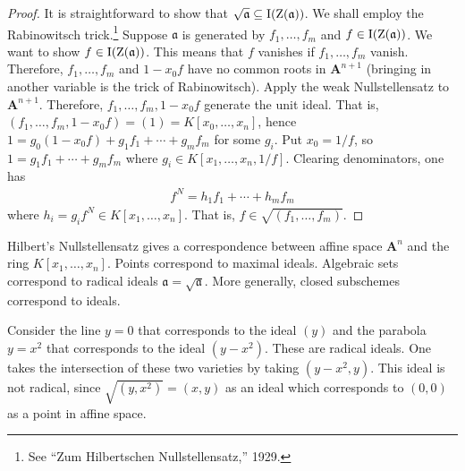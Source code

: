\documentclass[11pt, oneside,margin=1in]{article}
\begin{document}
\begin{proof}
It is straightforward to show that $\sqrt{\mathfrak{a}} \subseteq \operatorname{I}(\operatorname{Z}(\mathfrak{a}))$. We shall employ the Rabinowitsch trick.\footnote{See ``Zum Hilbertschen Nullstellensatz,'' 1929.} Suppose $\mathfrak{a}$ is generated by $f_1,\hdots, f_m$ and $f\in \operatorname{I}(\operatorname{Z}(\mathfrak{a}))$. We want to show $f\in \operatorname{I}(\operatorname{Z}(\mathfrak{a}))$. This means that $f$ vanishes if $f_1,\hdots, f_m$ vanish. Therefore, $f_1,\hdots, f_m$ and $1-x_0f$ have no common roots in $\mathbf{A}^{n+1}$ (bringing in another variable is the trick of Rabinowitsch). Apply the weak Nullstellensatz to $\mathbf{A}^{n+1}$. Therefore, $f_1,\hdots, f_m, 1-x_0f$ generate the unit ideal. That is, $(f_1,\hdots,f_m,1-x_0f) = (1) = K[x_0,\hdots, x_n]$, hence $1 = g_0(1-x_0f)+g_1f_1 +\cdots + g_mf_m$ for some $g_i$. Put $x_0=1/f$, so $1=g_1f_1+\cdots +g_mf_m$ where $g_i \in K[x_1,\hdots, x_n, 1/f]$. Clearing denominators, one has
\begin{align*}
	f^N = h_1f_1+\cdots + h_mf_m
\end{align*}
where $h_i=g_if^N\in K[x_1,\hdots, x_n]$. That is, $f\in \sqrt{(f_1,\hdots, f_m)} $.
\end{proof}

Hilbert's Nullstellensatz gives a correspondence between affine space $\mathbf{A}^n$ and the ring $K[x_1,\hdots, x_n]$. Points correspond to maximal ideals. Algebraic sets correspond to radical ideals $\mathfrak{a} = \sqrt{\mathfrak{a}} $. More generally, closed subschemes correspond to ideals.

\begin{example}[ ]\label{}\text{}
Consider the line $y=0$ that corresponds to the ideal $(y)$ and the parabola $y=x^2$ that corresponds to the ideal $(y-x^2)$. These are radical ideals. One takes the intersection of these two varieties by taking $(y-x^2, y)$. This ideal is not radical, since $\sqrt{(y, x^2)}=(x,y)$ as an ideal which corresponds to $(0,0)$ as a point in affine space.
\end{example}
\end{document}
